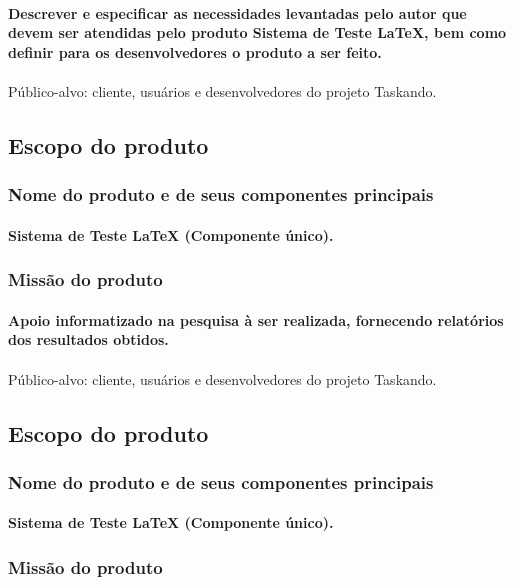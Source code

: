 \documentclass{article}
\begin{document}
		\paragraph{Descrever e especificar as necessidades levantadas pelo autor que devem ser atendidas pelo produto Sistema de Teste LaTeX, bem como definir para os desenvolvedores o produto a ser feito.}
\paragraph{}Público-alvo: cliente, usuários e desenvolvedores do projeto Taskando.
	\subsection{Escopo do produto}
		\subsubsection{Nome do produto e de seus componentes principais}
			\paragraph{Sistema de Teste LaTeX (Componente único). }
		\subsubsection{Missão do produto}
			\paragraph{Apoio informatizado na pesquisa à ser realizada, fornecendo relatórios dos resultados obtidos.}
			\paragraph{}Público-alvo: cliente, usuários e desenvolvedores do projeto Taskando.
	\subsection{Escopo do produto}
		\subsubsection{Nome do produto e de seus componentes principais}
			\paragraph{Sistema de Teste LaTeX (Componente único). }
		\subsubsection{Missão do produto}
\end{document}
